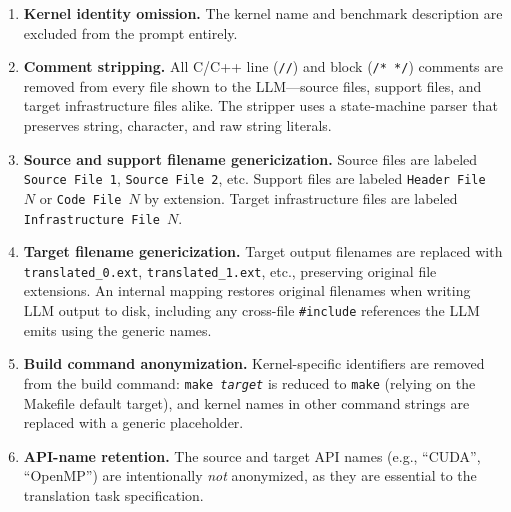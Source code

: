 \begin{enumerate}
  \item \textbf{Kernel identity omission.} The kernel name and benchmark description are excluded from the prompt entirely.
  \item \textbf{Comment stripping.} All C/C++ line (\texttt{//}) and block (\texttt{/* */}) comments are removed from every file shown to the LLM---source files, support files, and target infrastructure files alike. The stripper uses a state-machine parser that preserves string, character, and raw string literals.
  \item \textbf{Source and support filename genericization.} Source files are labeled \texttt{Source File~1}, \texttt{Source File~2}, etc. Support files are labeled \texttt{Header File~$N$} or \texttt{Code File~$N$} by extension. Target infrastructure files are labeled \texttt{Infrastructure File~$N$}.
  \item \textbf{Target filename genericization.} Target output filenames are replaced with \texttt{translated\_0.ext}, \texttt{translated\_1.ext}, etc., preserving original file extensions. An internal mapping restores original filenames when writing LLM output to disk, including any cross-file \texttt{\#include} references the LLM emits using the generic names.
  \item \textbf{Build command anonymization.} Kernel-specific identifiers are removed from the build command: \texttt{make~\textit{target}} is reduced to \texttt{make} (relying on the Makefile default target), and kernel names in other command strings are replaced with a generic placeholder.
  \item \textbf{API-name retention.} The source and target API names (e.g., ``CUDA'', ``OpenMP'') are intentionally \emph{not} anonymized, as they are essential to the translation task specification.
\end{enumerate}




